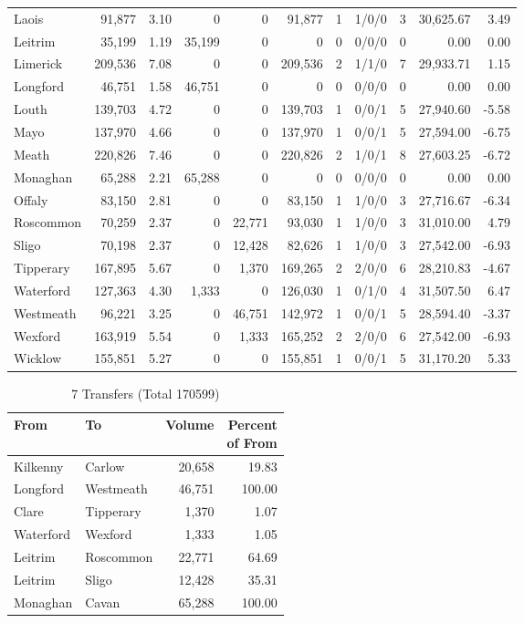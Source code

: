 \documentclass[a4paper]{article}
\begin{document}
\begin{longtable}{lrrrrrrlrrr}
Laois&91,877& 3.10&0&0&91,877&1&1/0/0&3&30,625.67& 3.49\\ 
Leitrim&35,199& 1.19&35,199&0&0&0&0/0/0&0& 0.00& 0.00\\ 
Limerick&209,536& 7.08&0&0&209,536&2&1/1/0&7&29,933.71& 1.15\\ 
Longford&46,751& 1.58&46,751&0&0&0&0/0/0&0& 0.00& 0.00\\ 
Louth&139,703& 4.72&0&0&139,703&1&0/0/1&5&27,940.60&-5.58\\ 
Mayo&137,970& 4.66&0&0&137,970&1&0/0/1&5&27,594.00&-6.75\\ 
Meath&220,826& 7.46&0&0&220,826&2&1/0/1&8&27,603.25&-6.72\\ 
Monaghan&65,288& 2.21&65,288&0&0&0&0/0/0&0& 0.00& 0.00\\ 
Offaly&83,150& 2.81&0&0&83,150&1&1/0/0&3&27,716.67&-6.34\\ 
Roscommon&70,259& 2.37&0&22,771&93,030&1&1/0/0&3&31,010.00& 4.79\\ 
Sligo&70,198& 2.37&0&12,428&82,626&1&1/0/0&3&27,542.00&-6.93\\ 
Tipperary&167,895& 5.67&0&1,370&169,265&2&2/0/0&6&28,210.83&-4.67\\ 
Waterford&127,363& 4.30&1,333&0&126,030&1&0/1/0&4&31,507.50& 6.47\\ 
Westmeath&96,221& 3.25&0&46,751&142,972&1&0/0/1&5&28,594.40&-3.37\\ 
Wexford&163,919& 5.54&0&1,333&165,252&2&2/0/0&6&27,542.00&-6.93\\ 
Wicklow&155,851& 5.27&0&0&155,851&1&0/0/1&5&31,170.20& 5.33\\ 
\end{longtable}

\begin{table}[htbp]
\caption{7 Transfers (Total 170599)}
\centering
\begin{tabular}{llrr} \toprule
From &To &Volume &\shortstack{Percent\\of From} \\ \midrule
Kilkenny&Carlow&20,658&19.83\\ 
Longford&Westmeath&46,751&100.00\\ 
Clare&Tipperary&1,370& 1.07\\ 
Waterford&Wexford&1,333& 1.05\\ 
Leitrim&Roscommon&22,771&64.69\\ 
Leitrim&Sligo&12,428&35.31\\ 
Monaghan&Cavan&65,288&100.00\\ 
\bottomrule
\end{tabular}
\end{table}
\end{document}
